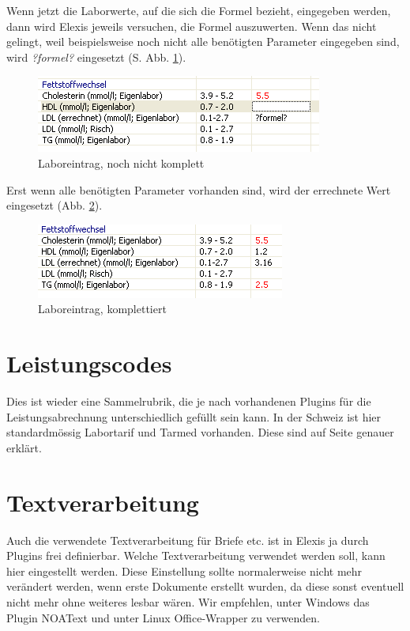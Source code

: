  Wenn jetzt die Laborwerte, auf die sich die Formel bezieht, eingegeben werden, dann wird Elexis jeweils versuchen, die Formel auszuwerten. Wenn das nicht gelingt, weil beispielsweise noch nicht alle benötigten Parameter eingegeben sind, wird \textit{?formel?} eingesetzt (S. Abb.  \ref{fig:labor4}).
\begin{figure}[htp]
\begin{center}
  \includegraphics{images/labor4}
  \caption{Laboreintrag, noch nicht komplett}
  \label{fig:labor4}
\end{center}
\end{figure}

Erst wenn alle benötigten Parameter vorhanden sind, wird der errechnete Wert eingesetzt (Abb. \ref{fig:labor5}).
\begin{figure}[htp]
\begin{center}
  \includegraphics{images/labor5}
  \caption{Laboreintrag, komplettiert}
  \label{fig:labor5}
\end{center}
\end{figure}

\section{Leistungscodes}
Dies ist wieder eine Sammelrubrik, die je nach vorhandenen Plugins für die Leistungsabrechnung unterschiedlich gefüllt sein kann. In der Schweiz ist hier standardmössig Labortarif und Tarmed vorhanden. Diese sind auf Seite \pageref{arzttarife} genauer erklärt.
\section{Textverarbeitung}
Auch die verwendete Textverarbeitung für Briefe etc. ist in Elexis ja durch Plugins frei definierbar. Welche Textverarbeitung verwendet werden soll, kann hier eingestellt werden. Diese Einstellung sollte normalerweise nicht mehr verändert werden, wenn erste Dokumente erstellt wurden, da diese sonst eventuell nicht mehr ohne weiteres lesbar wären. Wir empfehlen, unter Windows das Plugin NOAText und unter Linux Office-Wrapper zu verwenden.
